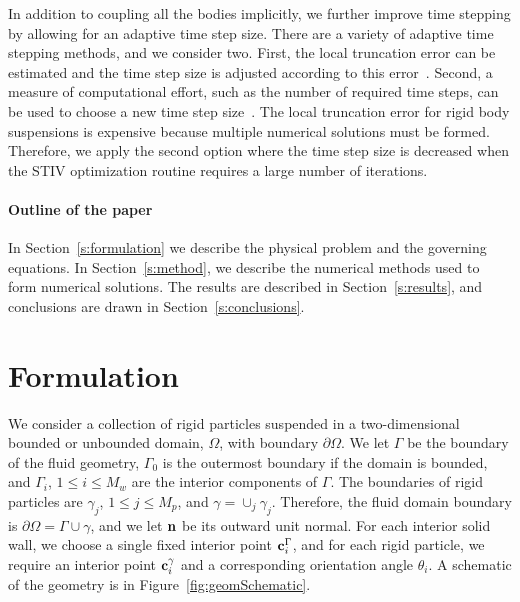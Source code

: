 \documentclass[preprint, 10pt]{elsarticle}
\begin{document}
In addition to coupling all the bodies implicitly, we further improve
time stepping by allowing for an adaptive time step size.  There are a
variety of adaptive time stepping methods, and we consider two.  First,
the local truncation error can be estimated and the time step size is
adjusted according to this error~\cite{Quaife2015, Quaife2015a,
Sorgentone2018}.  Second, a measure of computational effort, such as the
number of required time steps, can be used to choose a new time step
size~\cite{Kropinski1999}.  The local truncation error for rigid body
suspensions is expensive because multiple numerical solutions must be
formed.  Therefore, we apply the second option where the time step size
is decreased when the STIV optimization routine requires a large number
of iterations.

\paragraph{Outline of the paper}
In Section~\ref{s:formulation} we describe the physical problem and the
governing equations.  In Section~\ref{s:method}, we describe the
numerical methods used to form numerical solutions.
The results are described in Section~\ref{s:results}, and conclusions
are drawn in Section~\ref{s:conclusions}.


\section{Formulation\label{s:formulation}} 
We consider a collection of rigid particles suspended in a
two-dimensional bounded or unbounded domain, $\Omega$, with boundary
$\partial\Omega$. We let $\Gamma$ be the boundary of the fluid geometry,
$\Gamma_0$ is the outermost boundary if the domain is bounded, and
$\Gamma_i$, $1\leq i \leq M_w$ are the interior components of $\Gamma$.
The boundaries of rigid particles are $\gamma_j$, $1\leq j\leq M_p$, and
$\gamma = \cup_{j} \gamma_j$. Therefore, the fluid domain boundary is
$\partial\Omega =\Gamma \cup \gamma$, and we let ${\mathbf{n}}$ be its outward
unit normal.  For each interior solid wall, we choose a single fixed
interior point ${\mathbf{c}}^\Gamma_i$, and for each rigid particle, we require
an interior point ${\mathbf{c}}^\gamma_i$ and a corresponding orientation angle
$\theta_i$.  A schematic of the geometry is in
Figure~\ref{fig:geomSchematic}.
\end{document}
